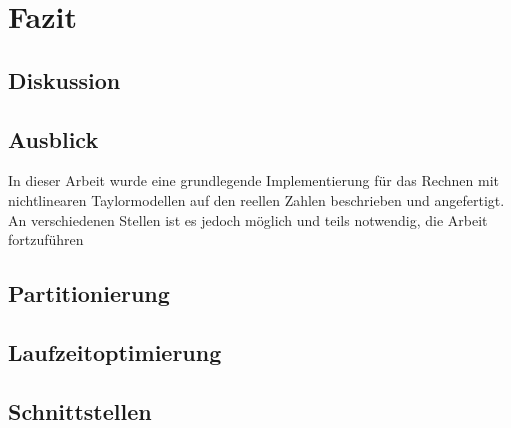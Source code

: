 
\chapter{Fazit}
\label{ch:fazit}

\section{Diskussion}

\section{Ausblick}
In dieser Arbeit wurde eine grundlegende Implementierung für das Rechnen mit nichtlinearen Taylormodellen auf den reellen Zahlen beschrieben und angefertigt. An verschiedenen Stellen ist es jedoch möglich und teils notwendig, die Arbeit fortzuführen

\section{Partitionierung}

\section{Laufzeitoptimierung}

\section{Schnittstellen}


